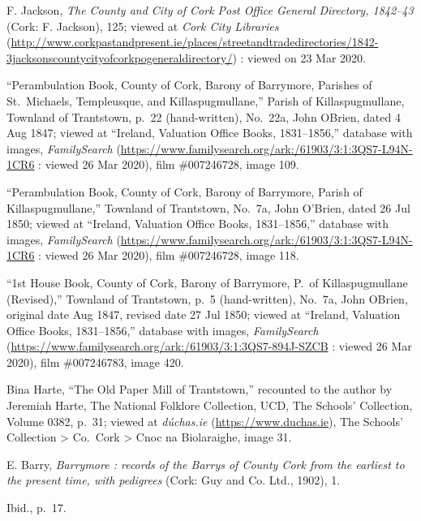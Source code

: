 \begin{thebibliography}{999}
\raggedright
\small


F. Jackson, \textit{The County and City of Cork Post Office General Directory, 1842--43} (Cork: F. Jackson), 125; viewed at \textit{Cork City Libraries} (\url{http://www.corkpastandpresent.ie/places/streetandtradedirectories/1842-3jacksonscountycityofcorkpogeneraldirectory/}) : viewed on 23 Mar 2020.

``Perambulation Book, County of Cork, Barony of Barrymore, Parishes of St.\ Michaels, Templeusque, and Killaspugmullane,'' Parish of Killaspugmullane, Townland of Trantstown, p.\ 22 (hand-written), No.\ 22a, John OBrien, dated 4 Aug 1847; viewed at ``Ireland, Valuation Office Books, 1831--1856,'' database with images, \textit{FamilySearch} (\url{https://www.familysearch.org/ark:/61903/3:1:3QS7-L94N-1CR6} : viewed 26 Mar 2020), film \#007246728, image 109.

``Perambulation Book, County of Cork, Barony of Barrymore, Parish of Killaspugmullane,'' Townland of Trantstown, No.\ 7a, John O'Brien, dated 26 Jul 1850; viewed at ``Ireland, Valuation Office Books, 1831--1856,'' database with images, \textit{FamilySearch} (\url{https://www.familysearch.org/ark:/61903/3:1:3QS7-L94N-1CR6} : viewed 26 Mar 2020), film \#007246728, image 118.

``1st House Book, County of Cork, Barony of Barrymore, P.\ of Killaspugmullane (Revised),'' Townland of Trantstown, p.\ 5 (hand-written), No.\ 7a, John OBrien, original date Aug 1847, revised date 27 Jul 1850; viewed at ``Ireland, Valuation Office Books, 1831--1856,'' database with images, \textit{FamilySearch} (\url{https://www.familysearch.org/ark:/61903/3:1:3QS7-894J-SZCB} : viewed 26 Mar 2020), film \#007246783, image 420.

Bina Harte, ``The Old Paper Mill of Trantstown,'' recounted to the author by Jeremiah Harte, The National Folklore Collection, UCD, The Schools' Collection, Volume 0382, p.\ 31; viewed at \textit{d\'{u}chas.ie} (\url{https://www.duchas.ie}), The Schools' Collection > Co.\ Cork > Cnoc na Biolaraighe, image 31.


E. Barry, \textit{Barrymore : records of the Barrys of County Cork from the earliest to the present time, with pedigrees} (Cork: Guy and Co. Ltd., 1902), 1.

Ibid., p.\ 17.


\end{thebibliography}
